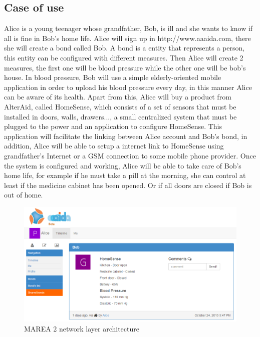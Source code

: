 \subsection{Case of use}\label{SS:Case-Of-Use}
Alice is a young teenager whose grandfather, Bob, is ill and she wants to know if all is fine in Bob's home life. Alice will sign up in http://www.aaaida.com, there she will create a bond called Bob. A bond is a entity that represents a person, this entity can be configured with different measures. Then Alice will create 2 measures, the first one will be blood pressure while the other one will be bob's house.
In blood pressure, Bob will use a simple elderly-oriented mobile application in order to upload his blood pressure every day, in this manner Alice can be aware of its health.
Apart from this, Alice will buy a product from AlterAid, called HomeSense, which consists of a set of sensors that must be installed in doors, walls, drawers..., a small centralized system that must be plugged to the power and an application to configure HomeSense.
This application will facilitate the linking between Alice account and Bob's bond, in addition, Alice will be able to setup a internet link to HomeSense using grandfather's Internet or a GSM connection to some mobile phone provider.
Once the system is configured and working, Alice will be able to take care of Bob's home life, for example if he must take a pill at the morning, she can control at least if the medicine cabinet has been opened. Or if all doors are closed if Bob is out of home.

\begin{figure}[H]\begin{center}
 \centering
  \captionsetup{justification=centering}
  \includegraphics[scale=0.75]{pictures/proposal/aaaida-use-case}
  \caption{MAREA 2 network layer architecture \label{fig:network-architecture}}
\end{center}\end{figure}

